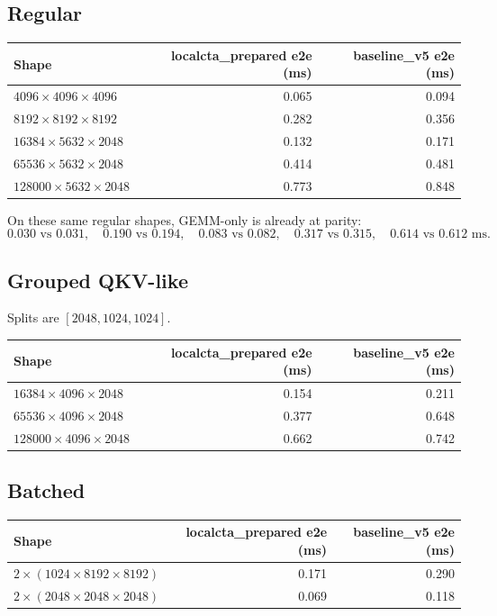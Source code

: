 \documentclass[11pt]{article}
\begin{document}
\subsection*{Regular}

\begin{center}
\begin{tabular}{lrr}
\toprule
Shape & localcta\_prepared e2e (ms) & baseline\_v5 e2e (ms) \\
\midrule
$4096 \times 4096 \times 4096$ & 0.065 & 0.094 \\
$8192 \times 8192 \times 8192$ & 0.282 & 0.356 \\
$16384 \times 5632 \times 2048$ & 0.132 & 0.171 \\
$65536 \times 5632 \times 2048$ & 0.414 & 0.481 \\
$128000 \times 5632 \times 2048$ & 0.773 & 0.848 \\
\bottomrule
\end{tabular}
\end{center}

On these same regular shapes, GEMM-only is already at parity:
\[
0.030 \text{ vs } 0.031,\quad
0.190 \text{ vs } 0.194,\quad
0.083 \text{ vs } 0.082,\quad
0.317 \text{ vs } 0.315,\quad
0.614 \text{ vs } 0.612 \text{ ms.}
\]

\subsection*{Grouped QKV-like}

Splits are \([2048, 1024, 1024]\).

\begin{center}
\begin{tabular}{lrr}
\toprule
Shape & localcta\_prepared e2e (ms) & baseline\_v5 e2e (ms) \\
\midrule
$16384 \times 4096 \times 2048$ & 0.154 & 0.211 \\
$65536 \times 4096 \times 2048$ & 0.377 & 0.648 \\
$128000 \times 4096 \times 2048$ & 0.662 & 0.742 \\
\bottomrule
\end{tabular}
\end{center}

\subsection*{Batched}

\begin{center}
\begin{tabular}{lrr}
\toprule
Shape & localcta\_prepared e2e (ms) & baseline\_v5 e2e (ms) \\
\midrule
$2 \times (1024 \times 8192 \times 8192)$ & 0.171 & 0.290 \\
$2 \times (2048 \times 2048 \times 2048)$ & 0.069 & 0.118 \\
\bottomrule
\end{tabular}
\end{center}
\end{document}
